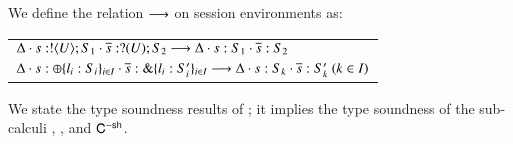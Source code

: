 




\smallskip

\begin{definition}%
\label{def:ses_red}
We define the relation $\longrightarrow$ on session environments as:
\\[-2mm]
%
\begin{center}
\begin{tabular}{l}
	$\Delta \cdot s: ! \langle U \rangle ; S_1 \cdot \overline{s}: ? (U) ; S_2 \longrightarrow
	\Delta \cdot s: S_1 \cdot \overline{s}: S_2$\\[1mm]
	$\Delta \cdot s: \oplus \{l_i: S_i\}_{i \in I} \cdot \overline{s}: \& \{l_i: S_i'\}_{i \in I} \longrightarrow \Delta \cdot s: S_k \cdot \overline{s}: S_k' \ (k \in I)$
\end{tabular}
\end{center}
\end{definition}


\noi We state the type soundness results of \HOp; it implies 
the type soundness of the sub-calculi \HO, \sessp, and $\mathsf{C}^{-\mathsf{sh}}$. 

